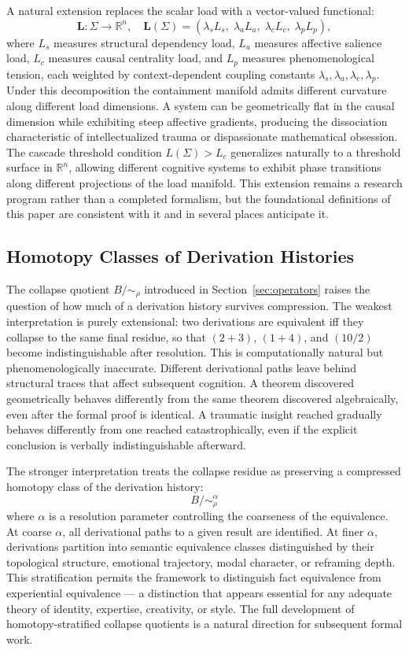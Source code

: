 \documentclass[12pt, a4paper]{article}
\theoremstyle{plain}
\theoremstyle{definition}
\theoremstyle{remark}
\begin{document}
A natural extension replaces the scalar load with a vector-valued functional:
\[
  \mathbf{L} : \Sigma \to \mathbb{R}^n,
  \quad
  \mathbf{L}(\Sigma) = (\lambda_s L_s,\; \lambda_a L_a,\; \lambda_c L_c,\; \lambda_p L_p),
\]
where $L_s$ measures structural dependency load, $L_a$ measures affective
salience load, $L_c$ measures causal centrality load, and $L_p$ measures
phenomenological tension, each weighted by context-dependent coupling
constants $\lambda_s, \lambda_a, \lambda_c, \lambda_p$. Under this
decomposition the containment manifold admits different curvature along
different load dimensions. A system can be geometrically flat in the causal
dimension while exhibiting steep affective gradients, producing the
dissociation characteristic of intellectualized trauma or dispassionate
mathematical obsession. The cascade threshold condition $L(\Sigma) > L_c$
generalizes naturally to a threshold surface in $\mathbb{R}^n$, allowing
different cognitive systems to exhibit phase transitions along different
projections of the load manifold. This extension remains a research program
rather than a completed formalism, but the foundational definitions of this
paper are consistent with it and in several places anticipate it.

\subsection{Homotopy Classes of Derivation Histories}

The collapse quotient $B/{\sim_\rho}$ introduced in Section~\ref{sec:operators}
raises the question of how much of a derivation history survives compression.
The weakest interpretation is purely extensional: two derivations are
equivalent iff they collapse to the same final residue, so that $(2+3)$,
$(1+4)$, and $(10/2)$ become indistinguishable after resolution. This is
computationally natural but phenomenologically inaccurate. Different
derivational paths leave behind structural traces that affect subsequent
cognition. A theorem discovered geometrically behaves differently from the
same theorem discovered algebraically, even after the formal proof is
identical. A traumatic insight reached gradually behaves differently from one
reached catastrophically, even if the explicit conclusion is verbally
indistinguishable afterward.

The stronger interpretation treats the collapse residue as preserving a
compressed homotopy class of the derivation history:
\[
  B/{\sim_\rho^\alpha}
\]
where $\alpha$ is a resolution parameter controlling the coarseness of the
equivalence. At coarse $\alpha$, all derivational paths to a given result
are identified. At finer $\alpha$, derivations partition into semantic
equivalence classes distinguished by their topological structure, emotional
trajectory, modal character, or reframing depth. This stratification permits
the framework to distinguish fact equivalence from experiential equivalence
— a distinction that appears essential for any adequate theory of identity,
expertise, creativity, or style. The full development of homotopy-stratified
collapse quotients is a natural direction for subsequent formal work.
\end{document}

